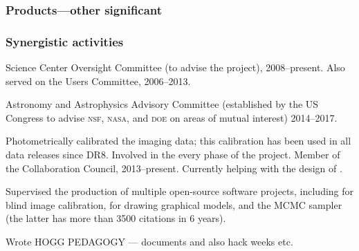 \documentclass[12pt, fullpage, letterpaper]{article}
\begin{document}
\subsubsection*{Products---other significant} %

\subsubsection*{Synergistic activities} %
\begin{list}{}{\hogglist}
\item
{} Science Center Oversight Committee (to advise the
 project), 2008--present. Also served
on the  Users Committee,
2006--2013.
\item
Astronomy and Astrophysics Advisory Committee (established by the US
Congress to advise \textsc{nsf}, \textsc{nasa}, and \textsc{doe} on
areas of mutual interest) 2014--2017.
\item
Photometrically calibrated the  imaging data; this
calibration has been used in all data releases since DR8.
Involved in the every phase of the
 project. Member of the
 Collaboration Council,
2013--present. Currently helping with the design of .
\item
Supervised the production of multiple open-source software projects,
including  for blind image calibration,
 for drawing graphical models, and the 
MCMC sampler (the latter has more than 3500 citations in 6 years).
\item
Wrote HOGG PEDAGOGY --- documents and also hack weeks etc.
\end{list}
\end{document}

